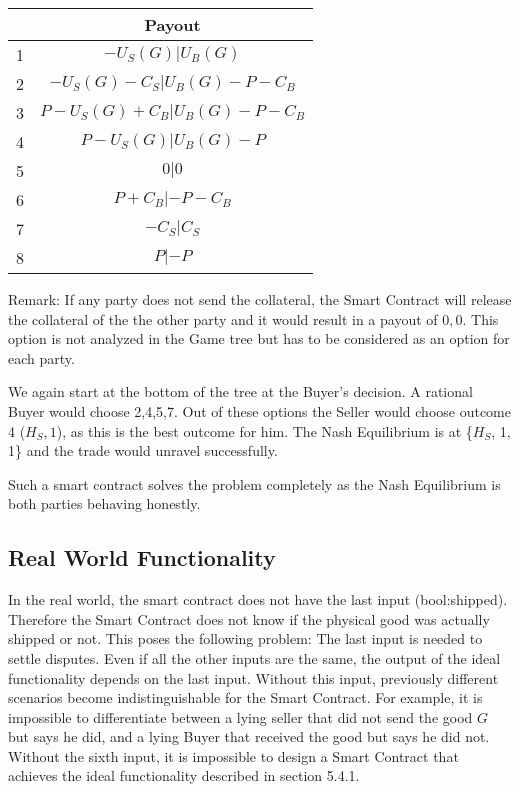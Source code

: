 \documentclass{cacthesis}
\begin{document}
\begin{center}
\begin{tabular}{ |c|c| }
\hline
& Payout  \\
\hline
\hline
1& $-U_S(G) | U_B(G)$\\
\hline
2& $-U_S(G) - C_S| U_B(G)-P - C_B  $\\
\hline
3&$P-U_S(G) + C_B | U_B(G)-P - C_B$ \\
\hline
4& $P-U_S(G)| U_B(G)-P$\\
\hline
5& $0|0$\\
\hline 
6& $P + C_B |-P - C_B$\\
\hline
7& $- C_S| C_S$\\
\hline
8& $P| -P$\\
\hline
\end{tabular}
\end{center}

Remark: If any party does not send the collateral, the Smart Contract will release the collateral of the the other party and it would result in a payout of $0,0$. This option is not analyzed in the Game tree but has to be considered as an option for each party.\newline

We again start at the bottom of the tree at the Buyer's decision. A rational Buyer would choose 2,4,5,7. Out of these options the Seller would choose outcome 4 ($H_S,1$), as this is the best outcome for him.\newline
The Nash Equilibrium is at \{$H_S$, 1, 1\} and the trade would unravel successfully.\newline

Such a smart contract solves the problem completely as the Nash Equilibrium is both parties behaving honestly.
\subsection{Real World Functionality}
In the real world, the smart contract does not have the last input (bool:shipped). Therefore the Smart Contract does not know if the physical good was actually shipped or not. \newline
This poses the following problem: The last input is needed to settle disputes. Even if all the other inputs are the same, the output of the ideal functionality depends on the last input. Without this input, previously different scenarios become indistinguishable for the Smart Contract.\newline
For example, it is impossible to differentiate between a lying seller that did not send the good $G$ but says he did, and a lying Buyer that received the good but says he did not.\newline 
Without the sixth input, it is impossible to design a Smart Contract that achieves the ideal functionality described in section 5.4.1.
\end{document}
